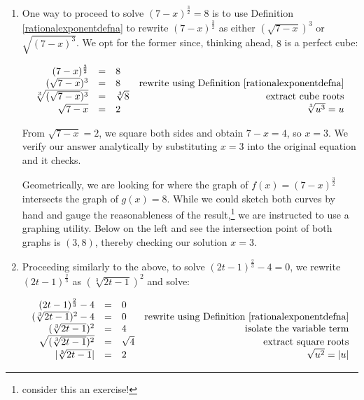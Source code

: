 \documentclass{ximera}
\begin{document}
\begin{ex}
\begin{enumerate}
\item  One way to proceed to solve  $(7-x)^{\frac{3}{2}} = 8$ is to use Definition \ref{rationalexponentdefna} to rewrite $(7-x)^{\frac{3}{2}}$ as either $(\sqrt{7-x})^3$ or $\sqrt{(7-x)^3}$.  We opt for the former since, thinking ahead,  $8$ is a perfect cube: 

\[ \begin{array}{rclr}

(7-x)^{\frac{3}{2}} & = & 8 & \\

(\sqrt{7-x})^3 & = & 8 & \text{rewrite using Definition \ref{rationalexponentdefna}} \\

\sqrt[3]{(\sqrt{7-x})^3} & = & \sqrt[3]{8} & \text{extract cube roots}  \\

\sqrt{7-x} & = & 2 & \text{$\sqrt[3]{u^3}= u$} \\ \end{array} \]

From $\sqrt{7-x} =  2$, we square both sides and obtain $7-x = 4$, so $x = 3$.  We verify our answer analytically by substituting $x=3$ into the original equation and it checks.

Geometrically, we are looking for where the graph of $f(x) = (7-x)^{\frac{3}{2}}$ intersects the graph of $g(x) = 8$.  While we could sketch both curves by hand and gauge the reasonableness of the result,\footnote{consider this an exercise!} we are instructed to use a graphing utility.  Below on the left and see the intersection point of both graphs is $(3,8)$, thereby checking our solution $x = 3$.

\item  Proceeding similarly to the above, to solve $(2t-1)^{\frac{2}{3}} -4 = 0$, we rewrite $(2t-1)^{\frac{2}{3}}$ as $(\sqrt[3]{2t-1})^2$ and solve:

\[ \begin{array}{rclr}
(2t-1)^{\frac{2}{3}} -4  & = & 0 & \\

(\sqrt[3]{2t-1})^2 - 4 & = & 0 & \text{rewrite using Definition \ref{rationalexponentdefna}} \\
(\sqrt[3]{2t-1})^2 & = & 4 & \text{isolate the variable term} \\

\sqrt{(\sqrt[3]{2t-1})^2 } & = & \sqrt{4} & \text{extract square roots} \\

|\sqrt[3]{2t-1}| & = & 2 & \text{$\sqrt{u^2} = |u|$} \\


\end{array}\]
\end{enumerate}
\end{ex}
\end{document}
